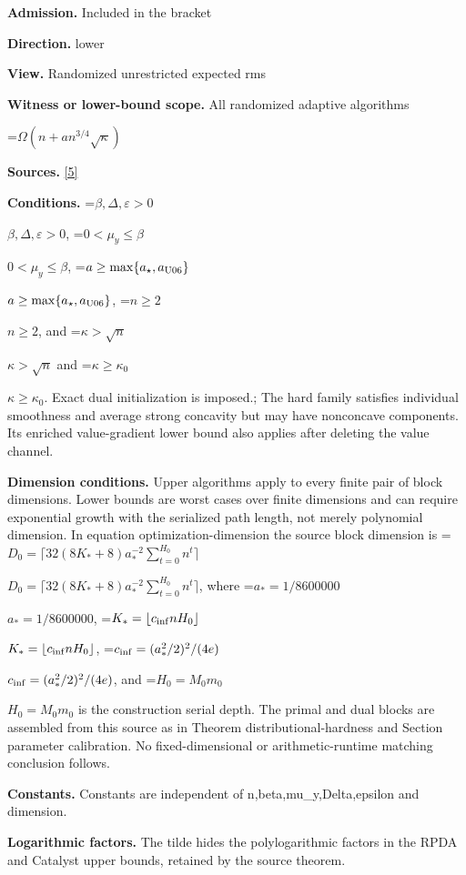 \documentclass[10pt,a4paper]{article}
\newcommand{\AtlasMath}[1]{\par\begingroup\centering\setbox0=\hbox{$\displaystyle #1$}\ifdim\wd0>1.4\linewidth\typeout{ATLAS WIDE FORMULA: \the\wd0}\fi\ifdim\wd0>\linewidth\resizebox{\linewidth}{!}{\box0}\else\box0\fi\par\endgroup}
\newcommand{\AtlasInlineMath}[1]{\begingroup\setbox0=\hbox{$#1$}\ifdim\wd0>.4\linewidth\endgroup\AtlasMath{#1}\else\endgroup$#1$\fi}
\begin{document}
\textbf{Admission.} Included in the bracket



\textbf{Direction.} lower



\textbf{View.} Randomized unrestricted expected rms



\textbf{Witness or lower-bound scope.} All randomized adaptive algorithms



\AtlasMath{\Omega(n+a n^{3/4}\sqrt\kappa)}


\textbf{Sources.} \href{https://github.com/WU-Wendao/Colombo/blob/main/colombo_sensorium/Complexity_altas/data/sources/colombo/U06/manuscript.pdf}{[5]}



\textbf{Conditions.} \AtlasInlineMath{\beta,\Delta,\varepsilon>0}, \AtlasInlineMath{0<\mu_y\le\beta}, \AtlasInlineMath{a\ge\max\{a_\star,a_{\rm U06}\}}, \AtlasInlineMath{n\ge2}, and \AtlasInlineMath{\kappa>\sqrt n} and \AtlasInlineMath{\kappa\ge\kappa_0}. Exact dual initialization is imposed.; The hard family satisfies individual smoothness and average strong concavity but may have nonconcave components. Its enriched value-gradient lower bound also applies after deleting the value channel.



\textbf{Dimension conditions.} Upper algorithms apply to every finite pair of block dimensions. Lower bounds are worst cases over finite dimensions and can require exponential growth with the serialized path length, not merely polynomial dimension. In equation optimization-dimension the source block dimension is \AtlasInlineMath{D_0=\lceil32(8K_*+8)a_*^{-2}\sum_{t=0}^{H_0}n^t\rceil}, where \AtlasInlineMath{a_*=1/8600000}, \AtlasInlineMath{K_*=\lfloor c_{\rm inf}nH_0\rfloor}, \AtlasInlineMath{c_{\rm inf}=(a_*^2/2)^2/(4e)}, and \AtlasInlineMath{H_0=M_0m_0} is the construction serial depth. The primal and dual blocks are assembled from this source as in Theorem distributional-hardness and Section parameter calibration. No fixed-dimensional or arithmetic-runtime matching conclusion follows.



\textbf{Constants.} Constants are independent of n,beta,mu\_y,Delta,epsilon and dimension.



\textbf{Logarithmic factors.} The tilde hides the polylogarithmic factors in the RPDA and Catalyst upper bounds, retained by the source theorem.
\end{document}
